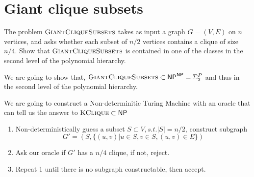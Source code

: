 

\maketitle
\thispagestyle{firststyle}
\vspace{-2.0cm}

\section{Giant clique subsets}
    The problem $\textsc{GiantCliqueSubsets}$ takes as input a graph $G = (V,E)$ on $n$ vertices, and asks whether each subset of $n/2$ vertices contains a clique of size $n/4$. Show that $\textsc{GiantCliqueSubsets}$ is contained in one of the classes in the second level of the polynomial hierarchy.
 
We are going to show that, $\textsc{GiantCliqueSubsets} \subset \mathsf{NP}^{\mathsf{NP}} = \Sigma_2^P$ and thus in the second level of the polynomial hierarchy.

We are going to construct a Non-determinitic Turing Machine with an oracle that can tell us the answer to $\textsc{KClique} \subset \mathsf{NP}$

\begin{enumerate}
    \item Non-deterministically guess a subset $S \subset V, s.t. |S| = n/2$, 
    construct subgraph $$G' = (S, \{(u, v) | u \in S, v \in S, (u, v) \in E\})$$
    \item Ask our oracle if $G'$ has a $n/4$ clique, if not, reject.
    \item Repeat 1 until there is no subgraph constructable, then accept.
\end{enumerate}



